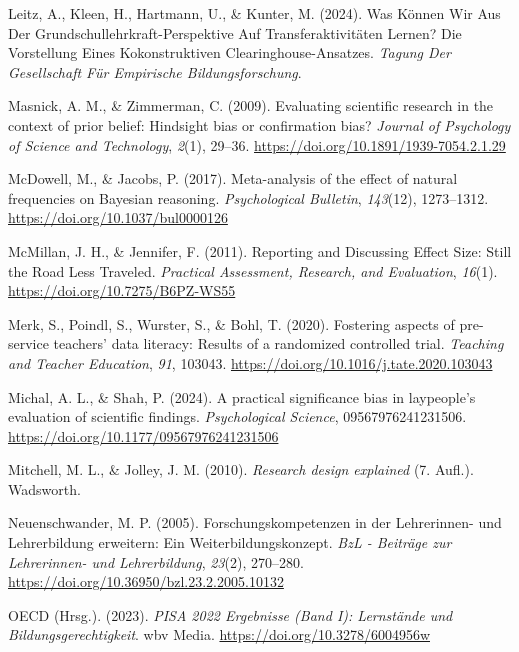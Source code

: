 \documentclass[
  jou,
  floatsintext,
  longtable,
  nolmodern,
  notxfonts,
  notimes,
  colorlinks=true,linkcolor=blue,citecolor=blue,urlcolor=blue]{apa7}
\newlength{\cslhangindent}
\newenvironment{CSLReferences}[2] %
 {\begin{list}{}{%
  \setlength{\itemindent}{0pt}
  \setlength{\leftmargin}{0pt}
  \setlength{\parsep}{0pt}
  \ifodd #1
   \setlength{\leftmargin}{\cslhangindent}
   \setlength{\itemindent}{-1\cslhangindent}
  \fi
  \setlength{\itemsep}{#2\baselineskip}}}
 {\end{list}}
\begin{document}
\begin{CSLReferences}{1}{0}
Leitz, A., Kleen, H., Hartmann, U., \& Kunter, M. (2024). Was K{ö}nnen
Wir Aus Der {Grundschullehrkraft-Perspektive} Auf
{Transferaktivit{ä}ten} Lernen? {Die Vorstellung} Eines Kokonstruktiven
{Clearinghouse-Ansatzes}. \emph{Tagung Der {Gesellschaft} F{ü}r
{Empirische Bildungsforschung}}.

Masnick, A. M., \& Zimmerman, C. (2009). Evaluating scientific research
in the context of prior belief: Hindsight bias or confirmation bias?
\emph{Journal of Psychology of Science and Technology}, \emph{2}(1),
29--36. \url{https://doi.org/10.1891/1939-7054.2.1.29}

McDowell, M., \& Jacobs, P. (2017). Meta-analysis of the effect of
natural frequencies on Bayesian reasoning. \emph{Psychological
Bulletin}, \emph{143}(12), 1273--1312.
\url{https://doi.org/10.1037/bul0000126}

McMillan, J. H., \& Jennifer, F. (2011). Reporting and Discussing Effect
Size: {Still} the Road Less Traveled. \emph{Practical Assessment,
Research, and Evaluation}, \emph{16}(1).
\url{https://doi.org/10.7275/B6PZ-WS55}

Merk, S., Poindl, S., Wurster, S., \& Bohl, T. (2020). Fostering aspects
of pre-service teachers' data literacy: Results of a randomized
controlled trial. \emph{Teaching and Teacher Education}, \emph{91},
103043. \url{https://doi.org/10.1016/j.tate.2020.103043}

Michal, A. L., \& Shah, P. (2024). A practical significance bias in
laypeople's evaluation of scientific findings. \emph{Psychological
Science}, 09567976241231506.
\url{https://doi.org/10.1177/09567976241231506}

Mitchell, M. L., \& Jolley, J. M. (2010). \emph{Research design
explained} (7. Aufl.). Wadsworth.

Neuenschwander, M. P. (2005). Forschungskompetenzen in der Lehrerinnen-
und Lehrerbildung erweitern: Ein Weiterbildungskonzept. \emph{BzL -
Beiträge zur Lehrerinnen- und Lehrerbildung}, \emph{23}(2), 270--280.
\url{https://doi.org/10.36950/bzl.23.2.2005.10132}

OECD (Hrsg.). (2023). \emph{{PISA} 2022 {Ergebnisse} ({Band} {I}):
{Lernstände} und {Bildungsgerechtigkeit}}. wbv Media.
\url{https://doi.org/10.3278/6004956w}


\end{CSLReferences}
\end{document}
